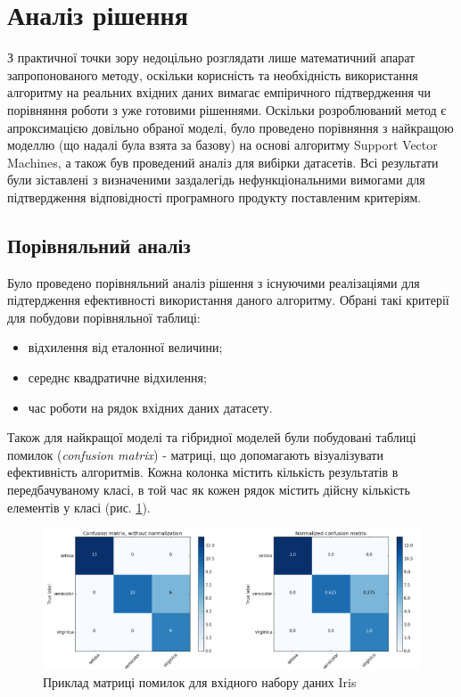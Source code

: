 \section{Аналіз рішення}
З практичної точки зору недоцільно розглядати лише математичний апарат запропонованого методу, оскільки корисність та необхідність використання алгоритму на реальних вхідних даних вимагає емпіричного підтвердження чи порівняння роботи з уже готовими рішеннями. Оскільки розроблюваний метод є апроксимацією довільно обраної моделі, було проведено порівняння з найкращою моделлю (що надалі була взята за базову) на основі алгоритму Support Vector Machines, а також був проведений аналіз для вибірки датасетів. Всі результати були зіставлені з визначеними заздалегідь нефункціональними вимогами для підтвердження відповідності програмного продукту поставленим критеріям.

\subsection{Порівняльний аналіз}
Було проведено порівняльний аналіз рішення з існуючими реалізаціями для підтердження ефективності використання даного алгоритму. Обрані такі критерії для побудови порівняльної таблиці:

\begin{itemize}
	\item відхилення від еталонної величини;
	\item середнє квадратичне відхилення;
	\item час роботи на рядок вхідних даних датасету.
\end{itemize}

Також для найкращої моделі та гібридної моделей були побудовані таблиці помилок (\textit{confusion matrix}) - матриці, що допомагають візуалізувати ефективність алгоритмів. Кожна колонка містить кількість результатів в передбачуваному класі, в той час як кожен рядок містить дійсну кількість елементів у класі (рис. \ref{fig:confusion_matrix}).

\begin{figure}[h!]
  \includegraphics[width=\linewidth]{figures/confusion_matrix.png}
  \caption{Приклад матриці помилок для вхідного набору даних Iris}
  \label{fig:confusion_matrix}
\end{figure}

